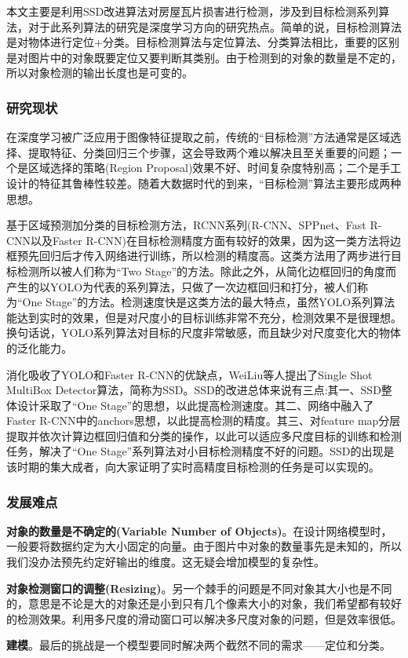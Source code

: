 本文主要是利用SSD改进算法对房屋瓦片损害进行检测，涉及到目标检测系列算法，对于此系列算法的研究是深度学习方向的研究热点。简单的说，目标检测算法是对物体进行定位+分类。目标检测算法与定位算法、分类算法相比，重要的区别是对图片中的对象既要定位又要判断其类别。由于检测到的对象的数量是不定的，所以对象检测的输出长度也是可变的。

\subsubsection{研究现状}
在深度学习被广泛应用于图像特征提取之前，传统的“目标检测”方法通常是区域选择、提取特征、分类回归三个步骤\cite{hkq}，这会导致两个难以解决且至关重要的问题；一个是区域选择的策略(Region Proposal)效果不好、时间复杂度特别高；二个是手工设计的特征其鲁棒性较差。随着大数据时代的到来，“目标检测”算法主要形成两种思想。

基于区域预测加分类的目标检测方法，RCNN系列(R-CNN\cite{rcnn}、SPPnet\cite{sppnet}、Fast R-CNN\cite{fastrcnn}以及Faster R-CNN\cite{fasterrcnn})在目标检测精度方面有较好的效果，因为这一类方法将边框预先回归后才传入网络进行训练，所以检测的精度高。这类方法用了两步进行目标检测所以被人们称为“Two Stage”的方法。除此之外，从简化边框回归的角度而产生的以YOLO\cite{yolo}为代表的系列算法，只做了一次边框回归和打分，被人们称为“One Stage”的方法。检测速度快是这类方法的最大特点，虽然YOLO系列算法能达到实时的效果，但是对尺度小的目标训练非常不充分，检测效果不是很理想。换句话说，YOLO系列算法对目标的尺度非常敏感，而且缺少对尺度变化大的物体的泛化能力。

消化吸收了YOLO和Faster R-CNN的优缺点，WeiLiu等人提出了Single Shot MultiBox Detector\cite{ssd}算法，简称为SSD。SSD的改进总体来说有三点:其一、SSD整体设计采取了“One Stage”的思想，以此提高检测速度。其二、网络中融入了Faster R-CNN\cite{fasterrcnn}中的anchors思想，以此提高检测的精度。其三、对feature map分层提取并依次计算边框回归值和分类的操作，以此可以适应多尺度目标的训练和检测任务，解决了“One Stage”系列算法对小目标检测精度不好的问题。SSD的出现是该时期的集大成者，向大家证明了实时高精度目标检测的任务是可以实现的。

\subsubsection{发展难点}
\textbf{对象的数量是不确定的(Variable Number of Objects)}。在设计网络模型时，一般要将数据约定为大小固定的向量。由于图片中对象的数量事先是未知的，所以我们没办法预先约定好输出的维度。这无疑会增加模型的复杂性。

\textbf{对象检测窗口的调整(Resizing)}。另一个棘手的问题是不同对象其大小也是不同的，意思是不论是大的对象还是小到只有几个像素大小的对象，我们希望都有较好的检测效果。利用多尺度的滑动窗口可以解决多尺度对象的问题，但是效率很低。

\textbf{建模}。最后的挑战是一个模型要同时解决两个截然不同的需求——定位和分类。
